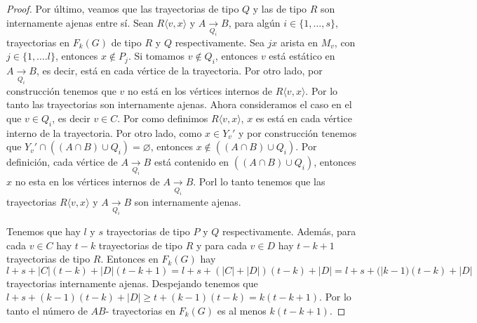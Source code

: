 \begin{proof}
    Por \'ultimo, veamos que las trayectorias de tipo $Q$ y las de tipo $R$ son
    internamente ajenas entre s\'i{}. Sean $R\langle v,x \rangle$ y $A
    \xrightarrow[Q_i]{}  B$, para alg\'un $i \in \{1, \dots, s\}$, trayectorias
    en $F_k(G)$ de tipo $R$ y $Q$ respectivamente. Sea $jx$ arista en $M_v$, con
    $j \in \{1, \dots. l\}$, entonces $x \notin P_j$. Si tomamos $v \notin Q_i$,
    entonces $v$ est\'a est\'atico en $A \xrightarrow[Q_i]{} B$, es decir,
    est\'a en cada v\'ertice de la trayectoria. Por otro lado, por
    construcci\'on tenemos que $v$ no est\'a en los v\'ertices internos de $R
    \langle v, x \rangle$. Por lo tanto las trayectorias son internamente
    ajenas. Ahora consideramos el caso en el que $v \in Q_i$, es decir $v \in
    C$. Por como definimos $R \langle v,x \rangle$, $x$ es est\'a en cada
    v\'ertice interno de la trayectoria. Por otro lado, como $x \in Y_v'$ y por
    construcci\'on tenemos que $Y_v ' \cap ((A\cap B) \cup Q_i) = \varnothing$,
    entonces $x \notin ((A \cap B) \cup Q_i)$. Por definici\'on, cada v\'ertice
    de $A \xrightarrow[Q_i]{}  B$ est\'a contenido en $((A \cap B) \cup Q_i)$,
    entonces $x$ no esta en los v\'ertices internos de $A \xrightarrow[Q_i]{}
    B$. Porl lo tanto tenemos que las trayectorias $R\langle v,x \rangle$ y $A
    \xrightarrow[Q_i]{}  B$ son internamente ajenas.

    Tenemos que hay $l$ y $s$ trayectorias de tipo $P$ y $Q$ respectivamente.
    Adem\'as, para cada $v \in C$ hay $t-k$ trayectorias de tipo $R$ y para cada
    $v \in D$ hay $t-k+1$ trayectorias de tipo $R$. Entonces en $F_k(G)$ hay $l+
    s+ |C|(t-k)+ |D|(t-k +1) = l + s + (|C| + |D|)(t-k) + |D| = l + s +
    (|k-1)(t-k) + |D|$ trayectorias internamente ajenas. Despejando tenemos que
    $l + s + (k-1)(t-k) + |D| \geq t+ (k-1)(t-k) = k (t -k +1)$. Por lo tanto el
    n\'umero de $AB$- trayectorias en $F_k(G)$ es al menos $k(t-k+1)$.
\end {proof}


